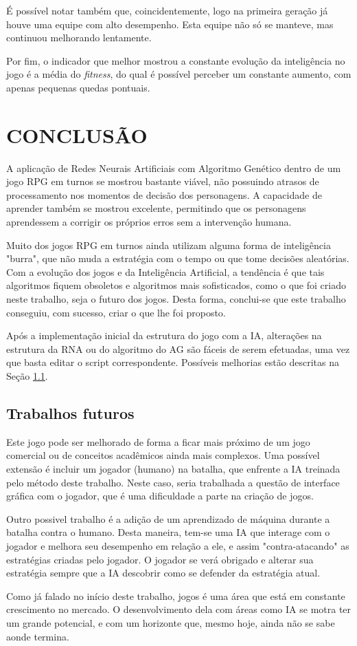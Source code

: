 \documentclass[
	12pt,					%
	openright,				%
	oneside,				%
	a4paper,				%
	bibjustif,				%
	chapter=TITLE,			%
	english,				%
	brazil,					%
	]{abntex2}
\begin{document}
	É possível notar também que, coincidentemente,
	logo na primeira geração já houve uma equipe com alto desempenho.
	Esta equipe não só se manteve,
	 mas continuou melhorando lentamente.
	
	Por fim, o indicador que melhor mostrou a constante evolução da inteligência no jogo é a média do \textit{fitness},
	do qual é possível perceber um constante aumento,
	com apenas pequenas quedas pontuais.
	
\chapter{CONCLUSÃO}
	
	A aplicação de Redes Neurais Artificiais com Algoritmo Genético dentro de um jogo RPG em turnos se mostrou bastante viável,
	não possuindo atrasos de processamento nos momentos de decisão dos personagens.
	A capacidade de aprender também se mostrou excelente,
	permitindo que os personagens aprendessem a corrigir os próprios erros sem a intervenção humana.
	
	Muito dos jogos RPG em turnos ainda utilizam alguma forma de inteligência "burra"{},
	que não muda a estratégia com o tempo ou que tome decisões aleatórias.
	Com a evolução dos jogos e da Inteligência Artificial,
	a tendência é que tais algoritmos fiquem obsoletos e
	algoritmos mais sofisticados, como o que foi criado neste trabalho, seja o futuro dos jogos.
	Desta forma, conclui-se que este trabalho conseguiu, com sucesso, criar o que lhe foi proposto.

	Após a implementação inicial da estrutura do jogo com a IA,
	alterações na estrutura da RNA ou do algoritmo do AG são fáceis de serem efetuadas,
	uma vez que basta editar o script correspondente.
	Possíveis melhorias estão descritas na Seção \ref{sec:trabFuturos}.
	
	\section{Trabalhos futuros} \label{sec:trabFuturos}
	Este jogo pode ser melhorado de forma a ficar mais próximo de um jogo comercial
	ou de conceitos acadêmicos ainda mais complexos.
	Uma possível extensão é incluir um jogador (humano) na batalha,
	que enfrente a IA treinada pelo método deste trabalho.
	Neste caso, seria trabalhada a questão de interface gráfica com o jogador,
	que é uma dificuldade a parte na criação de jogos.

	Outro possivel trabalho é a adição de um aprendizado de máquina durante a batalha contra o humano.
	Desta maneira, tem-se uma IA que interage com o jogador e melhora seu desempenho em relação a ele,
	e assim "contra-atacando"{} as estratégias criadas pelo jogador.
	O jogador se verá obrigado e alterar sua estratégia sempre que a IA descobrir como se defender da estratégia atual.

	Como já falado no início deste trabalho, jogos é uma área que está em constante crescimento no mercado.
	O desenvolvimento dela com áreas como IA se motra ter um grande potencial, e com um horizonte que, mesmo hoje, ainda não se sabe aonde termina.

	\postextual
	\renewcommand{\bibname}{REFERÊNCIAS BIBLIOGRÁFICAS}
	
\end{document}
